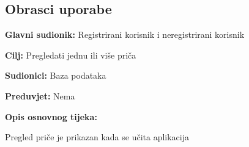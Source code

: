 			\subsection{Obrasci uporabe}
				
				
			
				
					\noindent {}
					\begin{packed_item}

						\item \textbf{Glavni sudionik: }Registrirani korisnik i neregistrirani korisnik
						\item  \textbf{Cilj:} Pregledati jednu ili više priča
						\item  \textbf{Sudionici:} Baza podataka
						\item  \textbf{Preduvjet:} Nema
						\item  \textbf{Opis osnovnog tijeka:}
						\item[] \begin{packed_enum}
							\item Pregled priče je prikazan kada se učita aplikacija
						\end{packed_enum}
		
					\end{packed_item}
				

